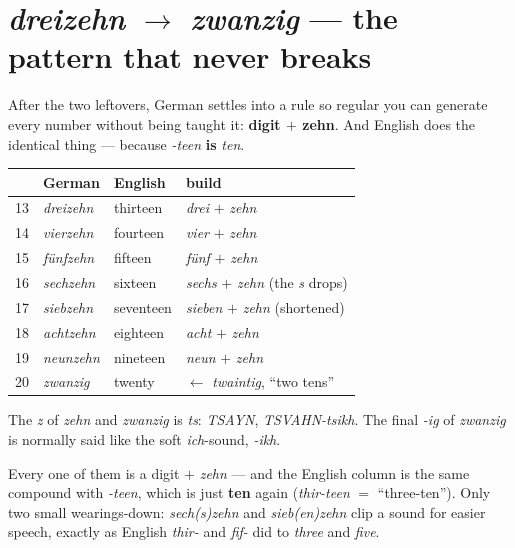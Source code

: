 \section[\emph{dreizehn} to \emph{zwanzig}]{\emph{dreizehn} $\to$ \emph{zwanzig} --- the pattern that never breaks}
\label{lesson:zahlen-13-20}

After the two leftovers, German settles into a rule so regular you can generate
every number without being taught it: \textbf{digit $+$ zehn}. And English does
the identical thing --- because \emph{-teen} \textbf{is} \emph{ten}.

\begin{center}
\begin{tabular}{@{}llll@{}}
\toprule
& German & English & build \\
\midrule
13 & \emph{dreizehn} & thirteen & \emph{drei} $+$ \emph{zehn} \\
14 & \emph{vierzehn} & fourteen & \emph{vier} $+$ \emph{zehn} \\
15 & \emph{f\"{u}nfzehn} & fifteen & \emph{f\"{u}nf} $+$ \emph{zehn} \\
16 & \emph{sechzehn} & sixteen & \emph{sechs} $+$ \emph{zehn} (the \emph{s} drops) \\
17 & \emph{siebzehn} & seventeen & \emph{sieben} $+$ \emph{zehn} (shortened) \\
18 & \emph{achtzehn} & eighteen & \emph{acht} $+$ \emph{zehn} \\
19 & \emph{neunzehn} & nineteen & \emph{neun} $+$ \emph{zehn} \\
20 & \emph{zwanzig} & twenty & $\leftarrow$ \emph{twaintig}, ``two tens'' \\
\bottomrule
\end{tabular}
\end{center}

\begin{sounds}
The \emph{z} of \emph{zehn} and \emph{zwanzig} is \emph{ts}: \emph{TSAYN},
\emph{TSVAHN-tsikh}. The final \emph{-ig} of \emph{zwanzig} is normally said
like the soft \emph{ich}-sound, \emph{-ikh}.
\end{sounds}

Every one of them is a digit $+$ \emph{zehn} --- and the English column is the
same compound with \emph{-teen}, which is just \textbf{ten} again
(\emph{thir-teen} $=$ ``three-ten''). Only two small wearings-down:
\emph{sech(s)zehn} and \emph{sieb(en)zehn} clip a sound for easier speech,
exactly as English \emph{thir-} and \emph{fif-} did to \emph{three} and
\emph{five}.

